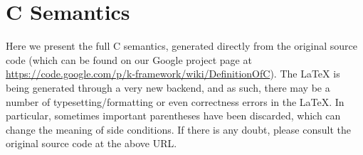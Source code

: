 \documentclass{article}
\begin{document}
\pagebreak
\section{C Semantics}
Here we present the full C semantics, generated directly from the original source code (which can be found on our Google project page at \url{https://code.google.com/p/k-framework/wiki/DefinitionOfC}).  The \LaTeX{} is being generated through a very new backend, and as such, there may be a number of typesetting/formatting or even correctness errors in the \LaTeX{}.  In particular, sometimes important parentheses have been discarded, which can change the meaning of side conditions.  If there is any doubt, please consult the original source code at the above URL.
\end{document}

